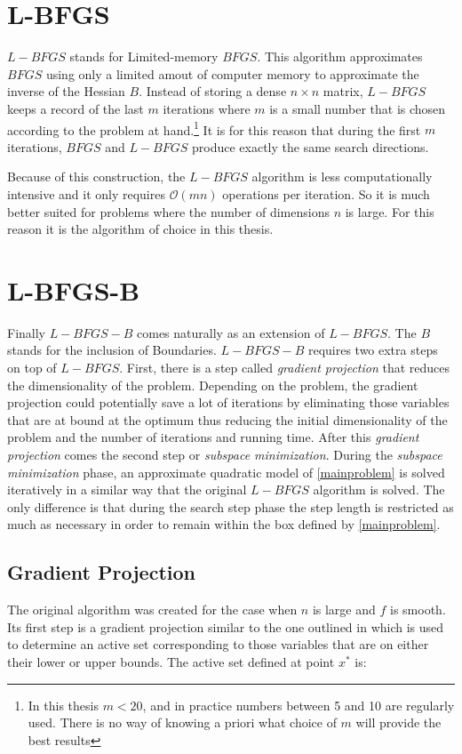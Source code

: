 \section{L-BFGS}

$L-BFGS$ stands for Limited-memory $BFGS$. This algorithm approximates $BFGS$ using only a limited amout of computer memory to approximate the inverse of the Hessian $B$. Instead of storing a dense $n \times n$ matrix, $L-BFGS$ keeps a record of the last $m$ iterations where $m$ is a small number that is chosen according to the problem at hand.\footnote{In this thesis $m < 20$, and in practice numbers between 5 and 10 are regularly used. There is no way of knowing a priori what choice of $m$ will provide the best results} It is for this reason that during the first $m$ iterations, $BFGS$ and $L-BFGS$ produce exactly the same search directions.

Because of this construction, the $L-BFGS$ algorithm is less computationally intensive and it only requires $\mathcal{O}(mn)$ operations per iteration. So it is much better suited for problems where the number of dimensions $n$ is large. For this reason it is the algorithm of choice in this thesis.

\section{L-BFGS-B}

Finally $L-BFGS-B$ comes naturally as an extension of $L-BFGS$. The $B$ stands for the inclusion of Boundaries.  $L-BFGS-B$ requires two extra steps on top of $L-BFGS$. First, there is a step called \emph{gradient projection} that reduces the dimensionality of the problem. Depending on the problem, the gradient projection could potentially save a lot of iterations by eliminating those variables that are at bound at the optimum thus reducing the initial dimensionality of the problem and the number of iterations and running time. After this \emph{gradient projection} comes the second step or \emph{subspace minimization}. During the \emph{subspace minimization} phase, an approximate quadratic model of \ref{mainproblem} is solved iteratively in a similar way that the original $L-BFGS$ algorithm is solved. The only difference is that during the search step phase the step length is restricted as much as necessary in order to remain within the box defined by \ref{mainproblem}.

\subsection{Gradient Projection}
The original algorithm was created for the case when $n$ is large and $f$ is smooth. Its first step is a gradient projection similar to the one outlined in \citep{gradproj1, gradproj2} which is used to determine an active set corresponding to those variables that are on either their lower or upper bounds. The active set defined at point $x^*$ is:

